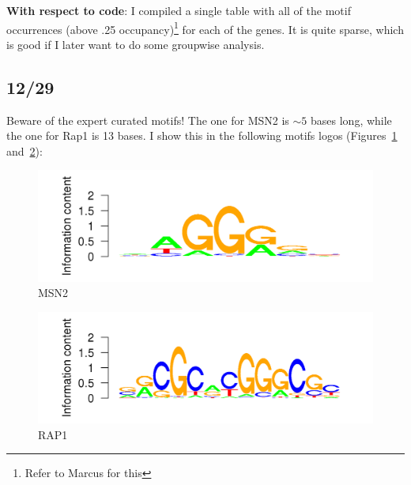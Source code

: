 \documentclass[12pt]{article}\usepackage[]{graphicx}\usepackage[]{color}
\newenvironment{knitrout}{}{} %
\begin{document}
\textbf{With respect to code}:
I compiled a single table with all of the motif occurrences (above .25 occupancy)\footnote{Refer to Marcus for this} for each of the genes. It is quite sparse, which is good if I later want to do some groupwise analysis.

\subsection{12/29}
Beware of the expert curated motifs! The one for MSN2 is $\sim 5$ bases long, while the one for Rap1 is 13 bases. I show this in the following motifs logos (Figures~\ref{fig:logo1} and~\ref{fig:logo2}):

\begin{knitrout}
\color{fgcolor}\begin{figure}[]


{\centering \includegraphics[width=.9\textwidth]{figure/latex-logo1} 

}

\caption[MSN2]{MSN2\label{fig:logo1}}
\end{figure}


\end{knitrout}


\begin{knitrout}
\color{fgcolor}\begin{figure}[]


{\centering \includegraphics[width=.9\textwidth]{figure/latex-logo2} 

}

\caption[RAP1]{RAP1\label{fig:logo2}}
\end{figure}


\end{knitrout}
\end{document}
